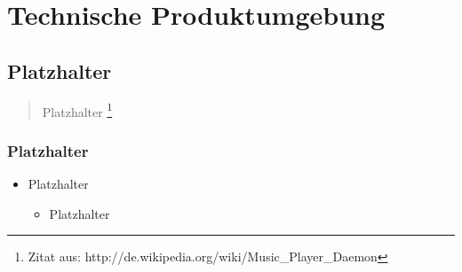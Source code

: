 \chapter{Technische Produktumgebung}

\section{Platzhalter}

\begin{quote}
Platzhalter
\footnote{Zitat aus: http://de.wikipedia.org/wiki/Music\_Player\_Daemon}
\end{quote}

\newpage
\subsection{Platzhalter}

\renewcommand{\labelitemi}{•}
\begin{itemize}
	\item Platzhalter
	
	\renewcommand{\labelitemi}{--}
	\begin{itemize}
		\item Platzhalter
	\end{itemize}
\end{itemize}
